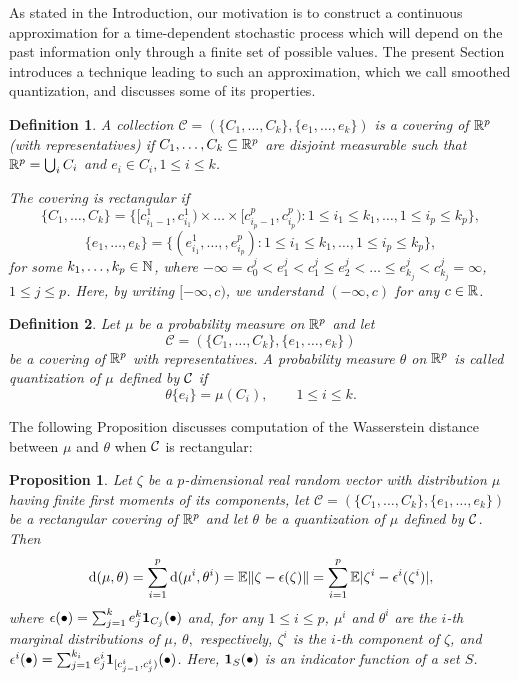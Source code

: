 \documentclass{article}              %
\newtheorem{definition}{Definition}
\newtheorem{proposition}{Proposition}
\begin{document}
As stated in the Introduction, our motivation is to construct a continuous approximation for a time-dependent stochastic process which will depend on the past information only through a finite set of possible values. The present Section introduces a technique leading to such an approximation, which we call smoothed quantization,
and discusses some of its properties. 
\begin{definition}
\label{def:cov}A collection $\mathcal{C}=(\{C_{1},\dots,C_{k}\},\{e_{1},\dots,e_{k}\})$
is a \emph{covering} \emph{of} $\mathbb{R}^{p}$ \emph{(with representatives)}
if $C_{1},\dots,C_{k}\subseteq\mathbb{R}^{p}$ are disjoint measurable such that $\mathbb{R}^{p}=\bigcup_{i}C_{i}$
and $e_{i}\in C_{i},1\leq i\leq k$. 

The covering is \emph{rectangular}
if 
\[
\{C_{1},\dots,C_{k}\}=\{[c_{i_{1}-1}^{1},c_{i_{1}}^{1})\times\dots\times[c_{i_{p}-1}^{p},c_{i_{p}}^{p}):1\leq i_{1}\leq k_{1},\dots,1\leq i_{p}\leq k_{p}\},
\]
\[
\{e_{1},\dots,e_{k}\}=\{(e_{i_{1}}^{1},\dots,,e_{i_{p}}^{p}):1\leq i_{1}\leq k_{1},\dots,1\leq i_{p}\leq k_{p}\},
\]
for some $k_{1},\dots,k_{p}\in\mathbb{N}$, where $-\infty=c_{0}^{j}<e_{1}^{j}<c_{1}^{j}\leq e_{2}^{j}<\dots\leq e_{k_{j}}^{j}<c_{k_{j}}^{j}=\infty$,
$1\leq j\leq p$. Here, by writing $[-\infty,c)$, we understand $(-\infty,c)$ for any $c\in \mathbb{R}$.
\end{definition}

\begin{definition}
Let $\mu$ be a probability measure on $\mathbb{R}^{p}$ and let $$\mathcal{C}=(\{C_{1},\dots,C_{k}\},\{e_{1},\dots,e_{k}\})$$
be a covering of $\mathbb{R}^{p}$ with representatives. A probability measure $\theta$ on $\mathbb{R}^{p}$
is called \emph{quantization of $\mu$ defined by $\mathcal{C}$} if 
\[
\theta\{e_{i}\}=\mu(C_{i}),\qquad1\leq i\leq k.
\]
\end{definition}

\noindent The following Proposition discusses computation of the Wasserstein distance between  $\mu$ and $\theta$
when $\mathcal{C}$ is rectangular:
\begin{proposition}
\label{prop:thesis}Let $\zeta$ be a $p$-dimensional real random
vector with distribution $\mu$ having finite first moments of its components, let $\mathcal{C}=(\{C_{1},\dots,C_{k}\},\{e_{1},\dots,e_{k}\})$
be a rectangular covering of $\mathbb{R}^{p}$ and let $\theta$ be a quantization
of $\mu$ defined by $\mathcal{C}$. Then 
\begin{equation}
\mathrm{d}(\mu,\theta)=\sum_{i=1}^{p}\mathrm{d}(\mu^{i},\theta^{i})=\mathbb{E}\|\zeta-\epsilon(\zeta)\|=\sum_{i=1}^{p}\mathbb{E}|\zeta^{i}-\epsilon^{i}(\zeta^{i})|,\label{eq:dis2-2-1}
\end{equation}
where $\epsilon(\bullet)=\sum_{j=1}^{k}e_{j}^{k}\mathbf{1}_{C_{j}}(\bullet)$
and, for any $1\leq i \leq p$, $\mu^{i}$ and $\theta^{i}$ are the $i$-th marginal
distributions of $\mu$, $\theta,$ respectively, $\zeta^{i}$ is
the $i$-th component of $\zeta$, and $\epsilon^{i}(\bullet)=\sum_{j=1}^{k_{i}}e_{j}^{i}\mathbf{1}_{[c_{j-1}^{i},c_{j}^{i})}(\bullet)$. Here, $\mathbf{1}_S(\bullet)$ is an indicator function of a set $S$.
\end{proposition}
\end{document}
